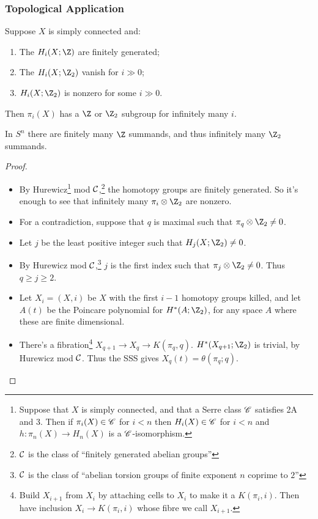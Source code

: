 \documentclass[11pt]{article}
\begin{document}
\begin{SerreCohModTwoEilMacLane}
\subsubsection*{Topological Application}
\begin{thm*}
Suppose $X$ is simply connected and:
\begin{enumerate}\squishlist
\item The $H_i(X;\Z)$ are finitely generated;
\item The $H_i(X;\Z_2)$ vanish for $i\gg0$;
\item $H_i(X;\Z_2)$ is nonzero for some $i\gg0$.
\end{enumerate}
Then $\pi_i(X)$ has a $\Z$ or $\Z_2$ subgroup for infinitely many $i$.
\end{thm*}
\begin{exmp*}
In $S^n$ there are finitely many $\Z$ summands, and thus infinitely many $\Z_2$ summands.
\end{exmp*}
\begin{proof}
\begin{itemize}\squishlist
\item By Hurewicz\footnote{Suppose that $X$ is simply connected, and that a Serre class $\mathscr{C}$ satisfies \textup{2A} and \textup{3}. Then if $\pi_i(X)\in\mathscr{C}$ for $i<n$ then $H_i(X)\in\mathscr{C}$ for $i<n$ and $h:\pi_n(X)\to H_n(X)$ is a $\mathscr{C}$-isomorphism.} mod $\mathcal{C}$,\footnote{$\mathcal{C}$ is the class of ``finitely generated abelian groups''} the homotopy groups are finitely generated. So it's enough to see that infinitely many $\pi_i\otimes\Z_2$ are nonzero.
\item For a contradiction, suppose that $q$ is maximal such that $\pi_q\otimes \Z_2\neq0$.
\item Let $j$ be the least positive integer such that $H_j(X;\Z_2)\neq0$.
\item By Hurewicz mod $\mathcal{C}$,\footnote{$\mathcal{C}$ is the class of ``abelian torsion groups of finite exponent $n$ coprime to $2$''} $j$ is the first index such that $\pi_j\otimes \Z_2\neq0$. Thus $q\geq j\geq2$.
\item Let $X_i=(X,i)$ be $X$ with the first $i-1$ homotopy groups killed, and let $A(t)$ be the Poincare polynomial for $H^*(A;\Z_2)$, for any space $A$ where these are finite dimensional.
\item There's a fibration\footnote{Build $X_{i+1}$ from $X_{i}$ by attaching cells to $X_{i}$ to make it a $K(\pi_i,i)$. Then have inclusion $X_{i}\to K(\pi_i,i)$ whose fibre we call $X_{i+1}$.} $X_{q+1}\to X_q\to K(\pi_q,q)$. $H^*(X_{q+1};\Z_2)$ is trivial, by Hurewicz mod $\mathcal{C}$. Thus the SSS gives $X_{q}(t)=\theta(\pi_q;q)$.

\end{itemize}
\end{proof}
\end{SerreCohModTwoEilMacLane}
\end{document}

